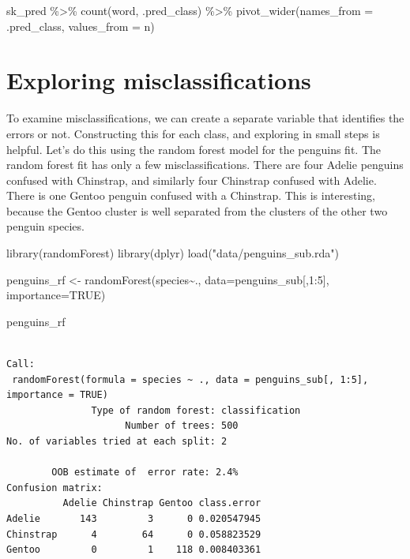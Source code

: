 \documentclass[
  letterpaper,
]{book}
\newenvironment{Shaded}{\begin{snugshade}}{\end{snugshade}}
\newcommand{\AttributeTok}[1]{\textcolor[rgb]{0.40,0.45,0.13}{#1}}
\newcommand{\ConstantTok}[1]{\textcolor[rgb]{0.56,0.35,0.01}{#1}}
\newcommand{\DecValTok}[1]{\textcolor[rgb]{0.68,0.00,0.00}{#1}}
\newcommand{\FunctionTok}[1]{\textcolor[rgb]{0.28,0.35,0.67}{#1}}
\newcommand{\NormalTok}[1]{\textcolor[rgb]{0.00,0.23,0.31}{#1}}
\newcommand{\OtherTok}[1]{\textcolor[rgb]{0.00,0.23,0.31}{#1}}
\newcommand{\SpecialCharTok}[1]{\textcolor[rgb]{0.37,0.37,0.37}{#1}}
\newcommand{\StringTok}[1]{\textcolor[rgb]{0.13,0.47,0.30}{#1}}
\begin{document}
\begin{Shaded}
\begin{Highlighting}[]
\NormalTok{sk\_pred }\SpecialCharTok{\%\textgreater{}\%} \FunctionTok{count}\NormalTok{(word, .pred\_class) }\SpecialCharTok{\%\textgreater{}\%}
  \FunctionTok{pivot\_wider}\NormalTok{(}\AttributeTok{names\_from =} \StringTok{\textasciigrave{}}\AttributeTok{.pred\_class}\StringTok{\textasciigrave{}}\NormalTok{, }\AttributeTok{values\_from =}\NormalTok{ n)}
\end{Highlighting}
\end{Shaded}

\hypertarget{exploring-misclassifications}{%
\chapter{Exploring
misclassifications}\label{exploring-misclassifications}}

To examine misclassifications, we can create a separate variable that
identifies the errors or not. Constructing this for each class, and
exploring in small steps is helpful. Let's do this using the random
forest model for the penguins fit. The random forest fit has only a few
misclassifications. There are four Adelie penguins confused with
Chinstrap, and similarly four Chinstrap confused with Adelie. There is
one Gentoo penguin confused with a Chinstrap. This is interesting,
because the Gentoo cluster is well separated from the clusters of the
other two penguin species.

\begin{Shaded}
\begin{Highlighting}[]
\FunctionTok{library}\NormalTok{(randomForest)}
\FunctionTok{library}\NormalTok{(dplyr)}
\FunctionTok{load}\NormalTok{(}\StringTok{"data/penguins\_sub.rda"}\NormalTok{)}

\NormalTok{penguins\_rf }\OtherTok{\textless{}{-}} \FunctionTok{randomForest}\NormalTok{(species}\SpecialCharTok{\textasciitilde{}}\NormalTok{.,}
                             \AttributeTok{data=}\NormalTok{penguins\_sub[,}\DecValTok{1}\SpecialCharTok{:}\DecValTok{5}\NormalTok{],}
                             \AttributeTok{importance=}\ConstantTok{TRUE}\NormalTok{)}
\end{Highlighting}
\end{Shaded}

\begin{Shaded}
\begin{Highlighting}[]
\NormalTok{penguins\_rf}
\end{Highlighting}
\end{Shaded}

\begin{verbatim}

Call:
 randomForest(formula = species ~ ., data = penguins_sub[, 1:5],      importance = TRUE) 
               Type of random forest: classification
                     Number of trees: 500
No. of variables tried at each split: 2

        OOB estimate of  error rate: 2.4%
Confusion matrix:
          Adelie Chinstrap Gentoo class.error
Adelie       143         3      0 0.020547945
Chinstrap      4        64      0 0.058823529
Gentoo         0         1    118 0.008403361
\end{verbatim}
\end{document}
